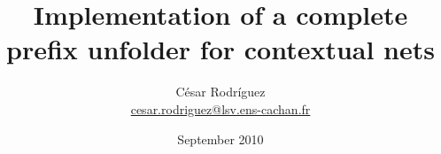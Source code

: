\documentclass[table,red,11pt]{beamer}
\title[]{Implementation of a complete prefix unfolder for contextual nets}
\author[César Rodríguez]{César Rodríguez\\{\footnotesize
\url{cesar.rodriguez@lsv.ens-cachan.fr}}}
\institute[LSV]{LSV, ENS Cachan}
\date{September 2010}
\begin{document}
\begin{frame}
\thispagestyle{empty}
\titlepage
\end{frame}

%
%
\end{document}
